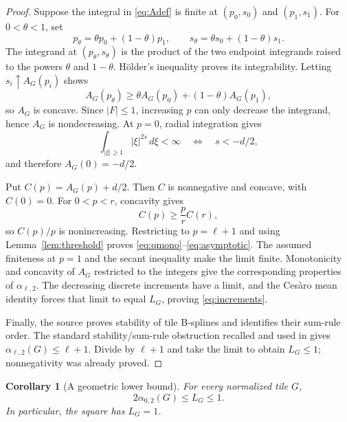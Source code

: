 \documentclass[11pt]{article}
\newtheorem{corollary}[theorem]{Corollary}
\theoremstyle{remark}
\newcommand{\dd}{\,d}
\begin{document}
\begin{proof}
Suppose the integral in \eqref{eq:Adef} is finite at $(p_0,s_0)$ and
$(p_1,s_1)$.  For $0<\theta<1$, set
\[
 p_\theta=\theta p_0+(1-\theta)p_1,
 \qquad s_\theta=\theta s_0+(1-\theta)s_1.
\]
The integrand at $(p_\theta,s_\theta)$ is the product of the two endpoint
integrands raised to the powers $\theta$ and $1-\theta$.  H\"older's
inequality proves its integrability.  Letting $s_i\uparrow A_G(p_i)$ shows
\[
 A_G(p_\theta)\ge\theta A_G(p_0)+(1-\theta)A_G(p_1),
\]
so $A_G$ is concave.  Since $|F|\le1$, increasing $p$ can only decrease the
integrand, hence $A_G$ is nondecreasing.  At $p=0$, radial integration gives
\[
 \int_{|\xi|\ge1}|\xi|^{2s}\dd\xi<\infty
 \quad\Longleftrightarrow\quad s<-d/2,
\]
and therefore $A_G(0)=-d/2$.

Put $C(p)=A_G(p)+d/2$.  Then $C$ is nonnegative and concave, with $C(0)=0$.
For $0<p<r$, concavity gives
\[
 C(p)\ge\frac p r C(r),
\]
so $C(p)/p$ is nonincreasing.  Restricting to $p=\ell+1$ and using
Lemma~\ref{lem:threshold} proves \eqref{eq:qmono}--\eqref{eq:asymptotic}.
The assumed finiteness at $p=1$ and the secant inequality make the limit
finite.  Monotonicity and concavity of $A_G$ restricted to the integers give
the corresponding properties of $\alpha_{\ell,2}$.  The decreasing discrete
increments have a limit, and the Ces\`aro mean identity forces that limit to
equal $L_G$, proving \eqref{eq:increments}.

Finally, the source proves stability of tile B-splines and identifies their
sum-rule order.  The standard stability/sum-rule obstruction recalled and
used in \cite{ProtasovZaitseva2025} gives
\(\alpha_{\ell,2}(G)\le\ell+1\).  Divide by $\ell+1$ and take the limit to
obtain $L_G\le1$; nonnegativity was already proved.
\end{proof}

\begin{corollary}[A geometric lower bound]\label{cor:lower}
For every normalized tile $G$,
\begin{equation}\label{eq:lower}
 2\alpha_{0,2}(G)\le L_G\le1.
\end{equation}
In particular, the square has $L_G=1$.
\end{corollary}
\end{document}

